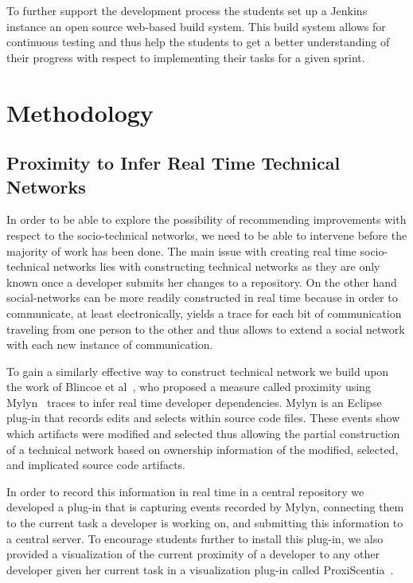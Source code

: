 To further support the development process the students set up a Jenkins instance an open source web-based build system.
This build system allows for continuous testing and thus help the students to get a better understanding of their progress with respect to implementing their tasks for a given sprint.

\section{Methodology}
\label{ch10:meth}
\subsection{Proximity to Infer Real Time Technical Networks}
\label{chap:making:subset:proximity}
In order to be able to explore the possibility of recommending improvements with respect to the socio-technical networks, we need to be able to intervene before the majority of work has been done.
The main issue with creating real time socio-technical networks lies with constructing technical networks as they are only known once a developer submits her changes to a repository.
On the other hand social-networks can be more readily constructed in real time because in order to communicate, at least electronically, yields a trace for each bit of communication traveling from one person to the other and thus allows to extend a social network with each new instance of communication.

To gain a similarly effective way to construct technical network we build upon the work of Blincoe et al~\cite{blincoe:cscw:2012}, who proposed a measure called proximity using Mylyn~\cite{kersten:aosd:2005} traces to infer real time developer dependencies.
Mylyn is an Eclipse plug-in that records edits and selects within source code files.
These events show which artifacts were modified and selected thus allowing the partial construction of a technical network based on ownership information of the modified, selected, and implicated source code artifacts.

In order to record this information in real time in a central repository we developed a plug-in that is capturing events recorded by Mylyn, connecting them to the current task a developer is working on, and submitting this information to a central server. 
To encourage students further to install this plug-in, we also provided a visualization of the current proximity of a developer to any other developer given her current task in a visualization plug-in called ProxiScentia~\cite{borici:chase:2012}.

